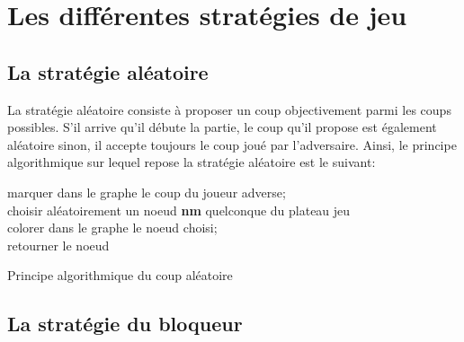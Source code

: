 \section{Les différentes stratégies de jeu}


\subsection{La stratégie aléatoire}
La stratégie aléatoire consiste à proposer un coup objectivement parmi les coups possibles. S'il arrive qu'il débute la partie, le coup qu'il propose est également aléatoire sinon, il accepte toujours le coup joué par l'adversaire.
Ainsi, le principe algorithmique sur lequel repose la stratégie aléatoire est le suivant: 
\\

\begin{algorithm}[H]

marquer dans le graphe le coup du joueur adverse;\\    
choisir aléatoirement un noeud \textbf{nm} quelconque du plateau jeu\\
colorer dans le graphe le noeud choisi;\\
retourner le noeud

\caption{Principe algorithmique du coup aléatoire}
\label{algoAléatoire}
\end{algorithm}

\subsection{La stratégie du bloqueur}

